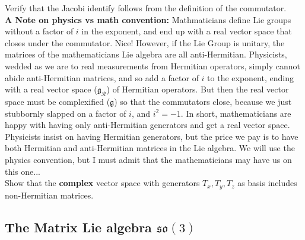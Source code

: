 \documentclass[12pt]{article}
\begin{document}
\exercise Verify that the Jacobi identify follows from the definition of the commutator.\\[5pt]

\noindent\textbf{A Note on physics vs math convention:} Mathmaticians
define Lie groups without a factor of $i$ in the exponent, and end up
with a real vector space that closes under the commutator. Nice!
However, if the Lie Group is unitary, the matrices of the
mathematicians Lie algebra are all anti-Hermitian.  Physicists, wedded
as we are to real measurements from Hermitian operators, simply cannot
abide anti-Hermitian matrices, and so add a factor of $i$ to the
exponent, ending with a real vector space ($\mathfrak{g}_\mathcal{R}$)
of Hermitian operators.  But then the real vector space must be
complexified ($\mathfrak{g}$) so that the commutators close, because
we just stubbornly slapped on a factor of $i$, and $i^2=-1$.  In
short, mathematicians are happy with having only anti-Hermitian
generators and get a real vector space.  Physicists insist on having
Hermitian generators, but the price we pay is to have both Hermitian
and anti-Hermitian matrices in the Lie algebra.  We will use the
physics convention, but I must admit that the mathematicians may have
us on this one...\\[5pt]

\exercise Show that the {\bf complex} vector space with generators ${T_x,
  T_y, T_z}$ as basis includes non-Hermitian matrices.\\[5pt]

\subsection*{The Matrix Lie algebra $\mathfrak{so}(3)$}
\end{document}
